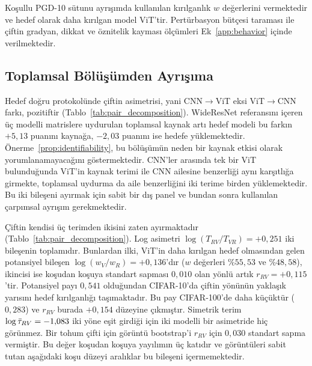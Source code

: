 Koşullu PGD-10 sütunu ayrışımda kullanılan kırılganlık $w$ değerlerini vermektedir ve hedef olarak daha kırılgan model ViT'tir. Pertürbasyon bütçesi taraması ile çiftin gradyan, dikkat ve öznitelik kayması ölçümleri Ek~\ref{app:behavior} içinde verilmektedir.

\subsection{Toplamsal Bölüşümden Ayrışıma}
\label{subsec:pair_decomposition}

Hedef doğru protokolünde çiftin asimetrisi, yani CNN$\rightarrow$ViT eksi ViT$\rightarrow$CNN farkı, pozitiftir (Tablo~\ref{tab:pair_decomposition}). WideResNet referansını içeren üç modelli matrislere uydurulan toplamsal kaynak artı hedef modeli bu farkın $+5{,}13$ puanını kaynağa, $-2{,}03$ puanını ise hedefe yüklemektedir. Önerme~\ref{prop:identifiability}, bu bölüşümün neden bir kaynak etkisi olarak yorumlanamayacağını göstermektedir. CNN'ler arasında tek bir ViT bulunduğunda ViT'in kaynak terimi ile CNN ailesine benzerliği aynı karşıtlığa girmekte, toplamsal uydurma da aile benzerliğini iki terime birden yüklemektedir. Bu iki bileşeni ayırmak için sabit bir dış panel ve bundan sonra kullanılan çarpımsal ayrışım gerekmektedir.

Çiftin kendisi üç terimden ikisini zaten ayırmaktadır (Tablo~\ref{tab:pair_decomposition}). Log asimetri $\log(T_{RV}/T_{VR}) = +0{,}251$ iki bileşenin toplamıdır. Bunlardan ilki, ViT'in daha kırılgan hedef olmasından gelen potansiyel bileşen $\log(w_V/w_R) = +0{,}136$'dır ($w$ değerleri $\%55{,}53$ ve $\%48{,}58$), ikincisi ise koşudan koşuya standart sapması $0{,}010$ olan yönlü artık $r_{RV} = +0{,}115$'tir. Potansiyel payı $0{,}541$ olduğundan CIFAR-10'da çiftin yönünün yaklaşık yarısını hedef kırılganlığı taşımaktadır. Bu pay CIFAR-100'de daha küçüktür ($0{,}283$) ve $r_{RV}$ burada $+0{,}154$ düzeyine çıkmıştır. Simetrik terim $\log\bar{\tau}_{RV} = -1{,}083$ iki yöne eşit girdiği için iki modelli bir asimetride hiç görünmez. Bir tohum çifti için görüntü bootstrap'i $r_{RV}$ için $0{,}030$ standart sapma vermiştir. Bu değer koşudan koşuya yayılımın üç katıdır ve görüntüleri sabit tutan aşağıdaki koşu düzeyi aralıklar bu bileşeni içermemektedir.

